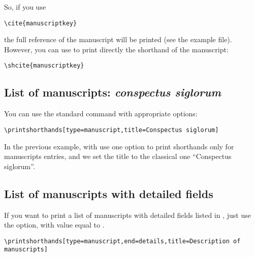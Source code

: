 \documentclass{ltxdockit}[2011/03/25]
\begin{document}
So, if you use 
\begin{verbatim}
\cite{manuscriptkey}
\end{verbatim}

the full reference of the manuscript will be printed (see the example file). However, you can use  to print directly the shorthand of the manuscript:

\begin{verbatim}
\shcite{manuscriptkey}
\end{verbatim}

\subsection{List of manuscripts: \emph{conspectus siglorum}}

You can use the standard command  with appropriate options:

\begin{verbatim}
\printshorthands[type=manuscript,title=Conspectus siglorum]
\end{verbatim}

In the previous example, with use one option to print shorthands only for manuscripts entries, and we set the title to the classical one \enquote{Conspectus siglorum}. 

\subsection{List of manuscripts with detailed fields }

If you want to print a list of manuscripts with detailed fields listed in , just use the  option, with value equal to 
.

\begin{verbatim}
\printshorthands[type=manuscript,end=details,title=Description of manuscripts]
\end{verbatim}
\end{document}
